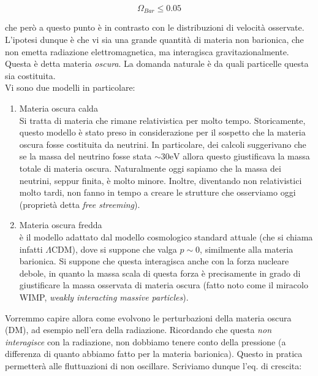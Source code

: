 \documentclass{report}
\begin{document}
\begin{equation}
    \Omega_{Bar} \leq 0.05
\end{equation}

che però a questo punto è in contrasto con le distribuzioni di velocità osservate. \\

L'ipotesi dunque è che vi sia una grande quantità di materia non barionica, che non emetta radiazione elettromagnetica, ma interagisca gravitazionalmente. Questa è detta materia \emph{oscura}. La domanda naturale è da quali particelle questa sia costituita. \\

Vi sono due modelli in particolare: 

\begin{enumerate}
    \item Materia oscura calda \\
    Si tratta di materia che rimane relativistica per molto tempo. Storicamente, questo modello è stato preso in considerazione per il sospetto che la materia oscura fosse costituita da neutrini. In particolare, dei calcoli suggerivano che se la massa del neutrino fosse stata $ \sim 30  \text{eV}$ allora questo giustificava la massa totale di materia oscura. Naturalmente oggi sapiamo che la massa dei neutrini, seppur finita, è molto minore. Inoltre, diventando non relativistici molto tardi, non fanno in tempo a creare le strutture che osserviamo oggi (proprietà detta \emph{free streeming}). 
    \item Materia oscura fredda \\
    è il modello adattato dal modello cosmologico standard attuale (che si chiama infatti $\Lambda$CDM), dove si suppone che valga $p \sim 0$, similmente alla materia barionica. Si suppone che questa interagisca anche con la forza nucleare debole, in quanto la massa scala di questa forza è precisamente in grado di giustificare la massa osservata di materia oscura (fatto noto come il miracolo WIMP, \emph{weakly interacting massive particles}). 
\end{enumerate}

Vorremmo capire allora come evolvono le perturbazioni della materia oscura (DM), ad esempio nell'era della radiazione. Ricordando che questa \emph{non interagisce} con la radiazione, non dobbiamo tenere conto della pressione (a differenza di quanto abbiamo fatto per la materia barionica). Questo in pratica permetterà alle fluttuazioni di non oscillare. Scriviamo dunque l'eq. di crescita: 
\end{document}
